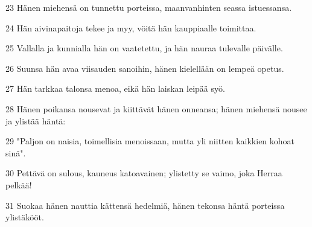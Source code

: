 \par 23 Hänen miehensä on tunnettu porteissa, maanvanhinten seassa istuessansa.
\par 24 Hän aivinapaitoja tekee ja myy, vöitä hän kauppiaalle toimittaa.
\par 25 Vallalla ja kunnialla hän on vaatetettu, ja hän nauraa tulevalle päivälle.
\par 26 Suunsa hän avaa viisauden sanoihin, hänen kielellään on lempeä opetus.
\par 27 Hän tarkkaa talonsa menoa, eikä hän laiskan leipää syö.
\par 28 Hänen poikansa nousevat ja kiittävät hänen onneansa; hänen miehensä nousee ja ylistää häntä:
\par 29 "Paljon on naisia, toimellisia menoissaan, mutta yli niitten kaikkien kohoat sinä".
\par 30 Pettävä on sulous, kauneus katoavainen; ylistetty se vaimo, joka Herraa pelkää!
\par 31 Suokaa hänen nauttia kättensä hedelmiä, hänen tekonsa häntä porteissa ylistäkööt.


